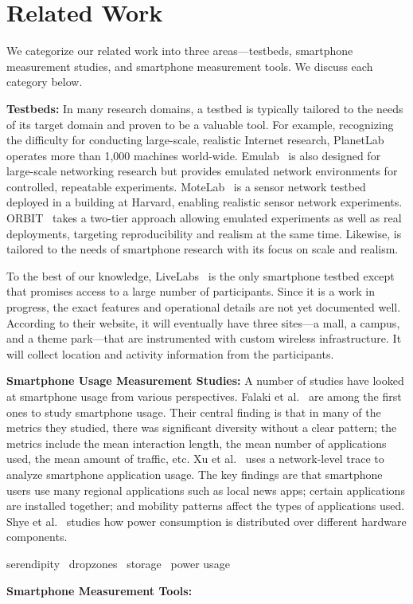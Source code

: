 \section{Related Work}
\label{sec:related}

We categorize our related work into three areas---testbeds, smartphone
measurement studies, and smartphone measurement tools. We discuss each category
below.

{\bf Testbeds:} In many research domains, a testbed is typically tailored
to the needs of its target domain and proven to be a valuable tool. For example,
recognizing the difficulty for conducting large-scale, realistic Internet
research, PlanetLab~\cite{peterson:ccr:2003, planetlab} operates more than 1,000
machines world-wide. Emulab~\cite{white:osdi:2002, emulab} is also designed for
large-scale networking research but provides emulated network environments for
controlled, repeatable experiments.  MoteLab~\cite{werner-allen:ipsn:2005} is a
sensor network testbed deployed in a building at Harvard, enabling realistic
sensor network experiments.  ORBIT~\cite{raychaudhuri:tridentcom:2005} takes a
two-tier approach allowing emulated experiments as well as real deployments,
targeting reproducibility and realism at the same time. Likewise, \PhoneLab{} is
tailored to the needs of smartphone research with its focus on scale and
realism.

To the best of our knowledge, LiveLabs~\cite{livelabs} is the only smartphone
testbed except \PhoneLab{} that promises access to a large number of
participants. Since it is a work in progress, the exact features and operational
details are not yet documented well. According to their website, it will
eventually have three sites---a mall, a campus, and a theme park---that are
instrumented with custom wireless infrastructure. It will collect location and
activity information from the participants.

{\bf Smartphone Usage Measurement Studies:} A number of studies have looked at
smartphone usage from various perspectives. Falaki et
al.~\cite{falaki:mobisys:2010} are among the first ones to study smartphone
usage. Their central finding is that in many of the metrics they studied, there
was significant diversity without a clear pattern; the metrics include the mean
interaction length, the mean number of applications used, the mean amount of
traffic, etc. Xu et al.~\cite{xu:imc:2011} uses a network-level trace to analyze
smartphone application usage. The key findings are that smartphone users use
many regional applications such as local news apps; certain applications are
installed together; and mobility patterns affect the types of applications
used. Shye et al.~\cite{shye:micro:2009} studies how power consumption is
distributed over different hardware components. 

serendipity~\cite{trestian:imc:2009}
dropzones~\cite{trestian:ton:2012}
storage~\cite{kim:fast:2012}
power usage~\cite{shye:micro:2009}

{\bf Smartphone Measurement Tools:}
